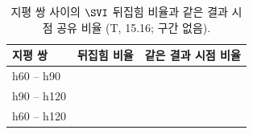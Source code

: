 \begin{table}[htbp]
  \centering
  \caption{지평 쌍 사이의 $\SVI$ 뒤집힘 비율과 같은 결과 시점 공유 비율 (T, 15.16; 구간 없음).}
  \label{tab:horizon}
  \small
  \begin{tabular}{@{}lrr@{}}
    \toprule
    지평 쌍 & 뒤집힘 비율 & 같은 결과 시점 비율 \\
    \midrule
    h60 -- h90 & \flipSixtyNinety{} & \sameEpSixtyNinety{} \\
    h90 -- h120 & \flipNinetyOneTwenty{} & \sameEpNinetyOneTwenty{} \\
    h60 -- h120 & \flipSixtyOneTwenty{} & \sameEpSixtyOneTwenty{} \\
    \bottomrule
  \end{tabular}
\end{table}
